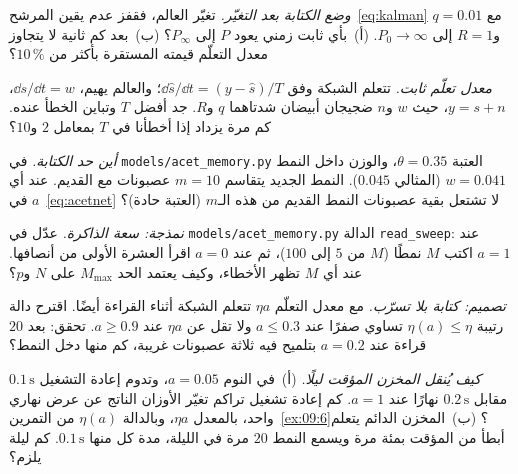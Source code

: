 \begin{exercise}[\lvlB]
\label{ex:09:2}
\emph{وضع الكتابة بعد التغيّر.} تغيّر العالم، فقفز عدم يقين المرشح~\eqref{eq:kalman} مع $q=0.01$ و$R=1$ إلى $P_0\to\infty$. (أ)~بأي ثابت زمني يعود $P$ إلى $P_\infty$؟ (ب)~بعد كم ثانية لا يتجاوز معدل التعلّم قيمته المستقرة بأكثر من $10\,\%$؟
\end{exercise}

\begin{exercise}[\lvlB]
\label{ex:09:3}
\emph{معدل تعلّم ثابت.} تتعلم الشبكة وفق $\dd\hat s/\dd t=(y-\hat s)/T$؛ والعالم يهيم، $\dd s/\dd t=w$، $y=s+n$، حيث $w$ و$n$ ضجيجان أبيضان شدتاهما $q$ و$R$. جد أفضل $T$ وتباين الخطأ عنده. كم مرة يزداد إذا أخطأنا في $T$ بمعامل $2$ و$10$؟
\end{exercise}

\begin{exercise}[\lvlB]
\label{ex:09:4}
\emph{أين حد الكتابة.} في \texttt{models/\allowbreak acet\_memory.py} العتبة $\theta=0.35$، والوزن داخل النمط $w=0.041$ (المثالي $0.045$). النمط الجديد يتقاسم $m=10$ عصبونات مع القديم. عند أي $a$ في~\eqref{eq:acetnet} لا تشتعل بقية عصبونات النمط القديم من هذه الـ$m$ (العتبة حادة)؟
\end{exercise}

\begin{exercise}[\lvlB]
\label{ex:09:5}
\emph{نمذجة: سعة الذاكرة.} عدّل في \texttt{models/\allowbreak acet\_memory.py} الدالة \texttt{read\_sweep}: عند $a=1$ اكتب $M$ نمطًا ($M$ من $5$ إلى $100$)، ثم عند $a=0$ اقرأ العشرة الأولى من أنصافها. عند أي $M$ تظهر الأخطاء، وكيف يعتمد الحد $M_{\max}$ على $N$ و$p$؟
\end{exercise}

\begin{exercise}[\lvlB]
\label{ex:09:6}
\emph{تصميم: كتابة بلا تسرّب.} مع معدل التعلّم $\eta a$ تتعلم الشبكة أثناء القراءة أيضًا. اقترح دالة رتيبة $\eta(a)\le\eta$ تساوي صفرًا عند $a\le0.3$ ولا تقل عن $\eta a$ عند $a\ge0.9$. تحقق: بعد $20$ قراءة عند $a=0.2$ بتلميح فيه ثلاثة عصبونات غريبة، كم منها دخل النمط؟
\end{exercise}

\begin{exercise}[\lvlC]
\label{ex:09:7}
\emph{كيف يُنقل المخزن المؤقت ليلًا.} (أ)~في النوم $a=0.05$، وتدوم إعادة التشغيل $0.1\,\text{s}$ مقابل $0.2\,\text{s}$ نهارًا عند $a=1$. كم إعادة تشغيل تراكم تغيّر الأوزان الناتج عن عرض نهاري واحد، بالمعدل $\eta a$، وبالدالة $\eta(a)$ من التمرين~\ref{ex:09:6}؟ (ب)~المخزن الدائم يتعلم أبطأ من المؤقت بمئة مرة ويسمع النمط $20$ مرة في الليلة، مدة كل منها $0.1\,\text{s}$. كم ليلة يلزم؟
\end{exercise}
